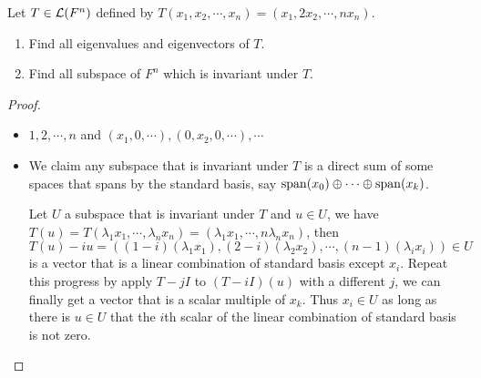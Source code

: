 \documentclass[../main.tex]{subfiles}
\begin{document}
\setcounter{exercise}{41}
\begin{exercise}
  Let $T \in \mathcal{L}(F^n)$ defined by $T(x_1, x_2, \cdots, x_n) = (x_1, 2 x_2, \cdots, n x_n)$.
  \begin{enumerate}
    \item Find all eigenvalues and eigenvectors of $T$.
    \item Find all subspace of $F^n$ which is invariant under $T$.
  \end{enumerate}
\end{exercise}
\begin{proof}
  ~
  \begin{itemize}
    \item $1, 2, \cdots, n$ and $(x_1, 0, \cdots), (0, x_2, 0, \cdots), \cdots$
    \item We claim any subspace that is invariant under $T$ is a direct sum of some
          spaces that spans by the standard basis, say $\operatorname{span}(x_0) \oplus \cdots \oplus \operatorname{span}(x_k)$.

          Let $U$ a subspace that is invariant under $T$ and $u \in U$,
          we have $T(u) = T(\lambda_1 x_1, \cdots, \lambda_n x_n) = (\lambda_1 x_1, \cdots, n \lambda_n x_n)$,
          then $T(u) - iu = ((1 - i) (\lambda_1 x_1), (2 - i) (\lambda_2 x_2), \cdots, (n - 1) (\lambda_i x_i)) \in U$
          is a vector that is a linear combination of standard basis except $x_i$.
          Repeat this progress by apply $T - jI$ to $(T - iI)(u)$ with a different $j$,
          we can finally get a vector that is a scalar multiple of $x_k$.
          Thus $x_i \in U$ as long as there is $u \in U$ that the $i$th scalar of the linear combination of standard basis is not zero.
  \end{itemize}
\end{proof}
\end{document}
